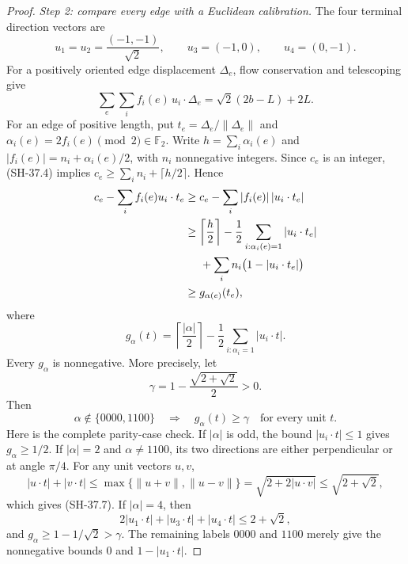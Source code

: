 \begin{proof}
\emph{Step 2: compare every edge with a Euclidean calibration.}
The four terminal direction vectors are
\[
 u_1=u_2=\frac{(-1,-1)}{\sqrt2},\qquad
 u_3=(-1,0),\qquad u_4=(0,-1).
\]
For a positively oriented edge displacement $\Delta_e$,
flow conservation and telescoping give
\[
 \sum_e\sum_i f_i(e)\,u_i\cdot\Delta_e
       =\sqrt2(2b-L)+2L.                            \tag{SH-37.5}
\]
For an edge of positive length, put
$t_e=\Delta_e/\|\Delta_e\|$ and
$\alpha_i(e)=2f_i(e)\pmod2\in\mathbb F_2$.
Write $h=\sum_i\alpha_i(e)$ and
$|f_i(e)|=n_i+\alpha_i(e)/2$, with $n_i$ nonnegative
integers.  Since $c_e$ is an integer, (SH-37.4) implies
$c_e\ge\sum_i n_i+\lceil h/2\rceil$.  Hence
\begin{align*}
 c_e-\sum_i f_i(e)u_i\cdot t_e
 &\ge c_e-\sum_i|f_i(e)|\,|u_i\cdot t_e|\\
 &\ge \left\lceil\frac h2\right\rceil
     -\frac12\sum_{i:\alpha_i(e)=1}|u_i\cdot t_e|\\
 &\hspace{1.4em}
     +\sum_i n_i\bigl(1-|u_i\cdot t_e|\bigr)\\
 &\ge g_{\alpha(e)}(t_e),
 \end{align*}
where
\[
 g_\alpha(t)=\left\lceil\frac{|\alpha|}2\right\rceil
                  -\frac12\sum_{i:\alpha_i=1}|u_i\cdot t|.
                                                        \tag{SH-37.6}
\]
Every $g_\alpha$ is nonnegative.  More precisely, let
\[
 \gamma=1-\frac{\sqrt{2+\sqrt2}}2>0.
\]
Then
\[
 \alpha\notin\{0000,1100\}
       \quad\Longrightarrow\quad g_\alpha(t)\ge\gamma
       \quad\text{for every unit }t.                 \tag{SH-37.7}
\]
Here is the complete parity-case check.  If $|\alpha|$ is
odd, the bound $|u_i\cdot t|\le1$ gives $g_\alpha\ge1/2$.
If $|\alpha|=2$ and $\alpha\ne1100$, its two directions
are either perpendicular or at angle $\pi/4$.  For any
unit vectors $u,v$,
\[
 |u\cdot t|+|v\cdot t|
 \le\max\{\|u+v\|,\|u-v\|\}
 =\sqrt{2+2|u\cdot v|}
 \le\sqrt{2+\sqrt2},
\]
which gives (SH-37.7).  If $|\alpha|=4$, then
\[
 2|u_1\cdot t|+|u_3\cdot t|+|u_4\cdot t|
       \le2+\sqrt2,
\]
and $g_\alpha\ge1-1/\sqrt2>\gamma$.
The remaining labels $0000$ and $1100$ merely give the
nonnegative bounds $0$ and $1-|u_1\cdot t|$.


\end{proof}
